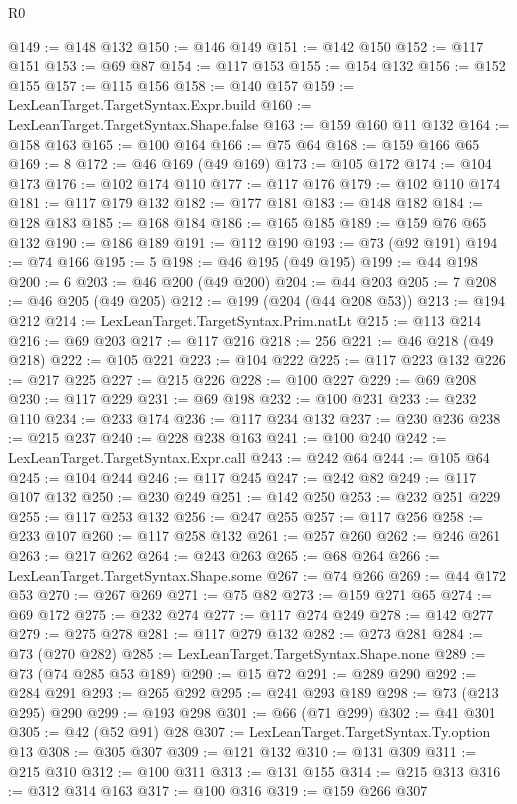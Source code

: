 \begin{lexlean}{R0}
\begin{coremodule}
@149 := @148 @132
@150 := @146 @149
@151 := @142 @150
@152 := @117 @151
@153 := @69 @87
@154 := @117 @153
@155 := @154 @132
@156 := @152 @155
@157 := @115 @156
@158 := @140 @157
@159 := LexLeanTarget.TargetSyntax.Expr.build
@160 := LexLeanTarget.TargetSyntax.Shape.false
@163 := @159 @160 @11 @132
@164 := @158 @163
@165 := @100 @164
@166 := @75 @64
@168 := @159 @166 @65
@169 := 8
@172 := @46 @169 (@49 @169)
@173 := @105 @172
@174 := @104 @173
@176 := @102 @174 @110
@177 := @117 @176
@179 := @102 @110 @174
@181 := @117 @179 @132
@182 := @177 @181
@183 := @148 @182
@184 := @128 @183
@185 := @168 @184
@186 := @165 @185
@189 := @159 @76 @65 @132
@190 := @186 @189
@191 := @112 @190
@193 := @73 (@92 @191)
@194 := @74 @166
@195 := 5
@198 := @46 @195 (@49 @195)
@199 := @44 @198
@200 := 6
@203 := @46 @200 (@49 @200)
@204 := @44 @203
@205 := 7
@208 := @46 @205 (@49 @205)
@212 := @199 (@204 (@44 @208 @53))
@213 := @194 @212
@214 := LexLeanTarget.TargetSyntax.Prim.natLt
@215 := @113 @214
@216 := @69 @203
@217 := @117 @216
@218 := 256
@221 := @46 @218 (@49 @218)
@222 := @105 @221
@223 := @104 @222
@225 := @117 @223 @132
@226 := @217 @225
@227 := @215 @226
@228 := @100 @227
@229 := @69 @208
@230 := @117 @229
@231 := @69 @198
@232 := @100 @231
@233 := @232 @110
@234 := @233 @174
@236 := @117 @234 @132
@237 := @230 @236
@238 := @215 @237
@240 := @228 @238 @163
@241 := @100 @240
@242 := LexLeanTarget.TargetSyntax.Expr.call
@243 := @242 @64
@244 := @105 @64
@245 := @104 @244
@246 := @117 @245
@247 := @242 @82
@249 := @117 @107 @132
@250 := @230 @249
@251 := @142 @250
@253 := @232 @251 @229
@255 := @117 @253 @132
@256 := @247 @255
@257 := @117 @256
@258 := @233 @107
@260 := @117 @258 @132
@261 := @257 @260
@262 := @246 @261
@263 := @217 @262
@264 := @243 @263
@265 := @68 @264
@266 := LexLeanTarget.TargetSyntax.Shape.some
@267 := @74 @266
@269 := @44 @172 @53
@270 := @267 @269
@271 := @75 @82
@273 := @159 @271 @65
@274 := @69 @172
@275 := @232 @274
@277 := @117 @274 @249
@278 := @142 @277
@279 := @275 @278
@281 := @117 @279 @132
@282 := @273 @281
@284 := @73 (@270 @282)
@285 := LexLeanTarget.TargetSyntax.Shape.none
@289 := @73 (@74 @285 @53 @189)
@290 := @15 @72
@291 := @289 @290
@292 := @284 @291
@293 := @265 @292
@295 := @241 @293 @189
@298 := @73 (@213 @295) @290
@299 := @193 @298
@301 := @66 (@71 @299)
@302 := @41 @301
@305 := @42 (@52 @91) @28
@307 := LexLeanTarget.TargetSyntax.Ty.option @13
@308 := @305 @307
@309 := @121 @132
@310 := @131 @309
@311 := @215 @310
@312 := @100 @311
@313 := @131 @155
@314 := @215 @313
@316 := @312 @314 @163
@317 := @100 @316
@319 := @159 @266 @307

\end{coremodule}
\end{lexlean}
